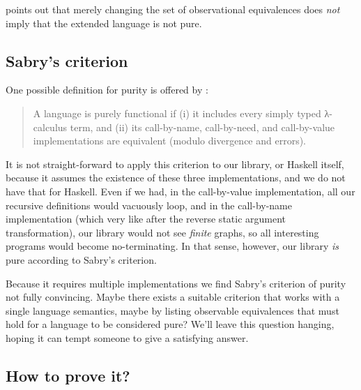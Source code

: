\documentclass[manuscript,screen,acmsmall]{acmart}
\begin{document}
 points out that merely changing the set of observational equivalences does \emph{not} imply that the extended language is not pure.

\subsection{Sabry's criterion}

One possible definition for purity is offered by \citet{sabry}:
\begin{quote}
A language is purely functional if (i) it includes every simply typed λ-calculus term, and
(ii) its call-by-name, call-by-need, and call-by-value implementations are equivalent (modulo
divergence and errors).
\end{quote}

It is not straight-forward to apply this criterion to our library, or Haskell itself, because it assumes the existence of these three implementations, and we do not have that for Haskell. Even if we had, in the call-by-value implementation, all our recursive definitions would vacuously loop, and in the call-by-name implementation (which very like after the reverse static argument transformation), our library would not see \emph{finite} graphs, so all interesting programs would become no-terminating. In that sense, however, our library \emph{is} pure according to Sabry’s criterion.

Because it requires multiple implementations we find Sabry’s criterion of purity not fully convincing. Maybe there exists a suitable criterion that works with a single language semantics, maybe by listing observable equivalences that must hold for a language to be considered pure?
We'll leave this question hanging, hoping it can tempt someone to give a satisfying answer.

% 


\subsection{How to prove it?}
\end{document}
